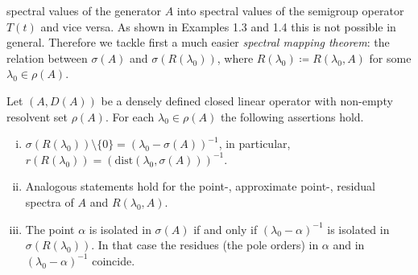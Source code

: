 spectral values of the generator $A$ into spectral values of the semigroup operator $T(t)$ and vice versa.
As shown in Examples 1.3 and 1.4 this is not possible in general.
Therefore we tackle first a much easier \emph{spectral mapping theorem}: the relation between $\sigma(A)$ and $\sigma(R(\lambda_{0}))$, where $R(\lambda_{0}) \coloneqq R(\lambda_{0},A)$ for some $\lambda_{0} \in \rho(A)$.
\begin{proposition}\label{prop:a3-2.5}
Let $(A,D(A))$ be a densely defined closed linear operator with non-empty resolvent set $\rho(A)$.
For each $\lambda_{0} \in \rho(A)$ the following assertions hold.

\begin{enumerate}[(i)]
\item 
$\sigma(R(\lambda_{0})) \setminus \{0\} = (\lambda_{0} - \sigma(A))^{-1}$, in  particular, $r(R(\lambda_{0})) = (\mathrm{dist}(\lambda_{0},\sigma(A)))^{-1}$.

\item 
Analogous statements hold for the point-, approximate point-, residual spectra of $A$ and $R(\lambda_{0},A)$.

\item 
The point $\alpha$ is isolated in $\sigma(A)$ if and only if $(\lambda_{0}-\alpha)^{-1}$ is isolated in $\sigma(R(\lambda_{0}))$.
In that case the residues (\resp the pole orders) in $\alpha$ and in $(\lambda_{0}-\alpha)^{-1}$ coincide.
\end{enumerate}
\end{proposition}
